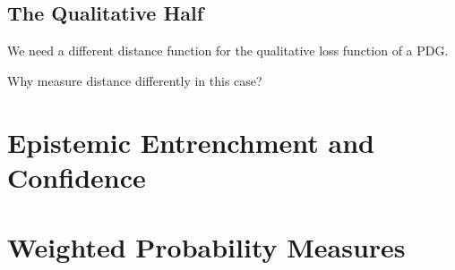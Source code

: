 \documentclass{article}
\begin{document}
\subsection{The Qualitative Half}
We need a different distance function for the qualitative loss function of a PDG.


Why measure distance differently in this case?


\section{Epistemic Entrenchment and Confidence}
\section{Weighted Probability Measures}
\end{document}
